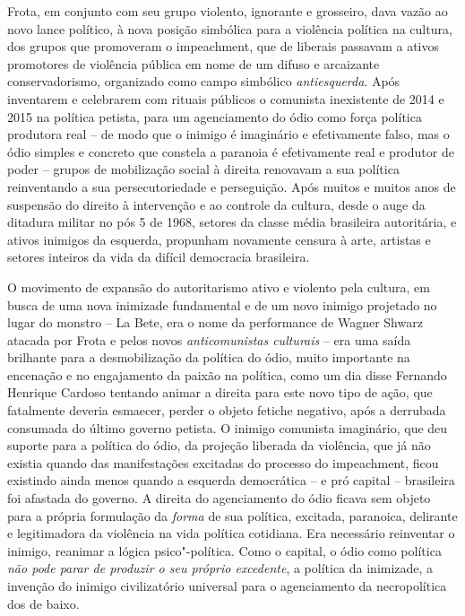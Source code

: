 Frota, em conjunto com seu grupo violento, ignorante e grosseiro, dava
vazão ao novo lance político, à nova posição simbólica para a violência
política na cultura, dos grupos que promoveram o impeachment, que de
liberais passavam a ativos promotores de violência pública em nome de um
difuso e arcaizante conservadorismo, organizado como campo simbólico
\emph{antiesquerda}. Após inventarem e celebrarem com rituais públicos o
comunista inexistente de 2014 e 2015 na política petista, para um
agenciamento do ódio como força política produtora real -- de modo que o
inimigo é imaginário e efetivamente falso, mas o ódio simples e concreto
que constela a paranoia é efetivamente real e produtor de poder --
grupos de mobilização social à direita renovavam a sua política
reinventando a sua persecutoriedade e perseguição. Após muitos e muitos
anos de suspensão do direito à intervenção e ao controle da cultura,
desde o auge da ditadura militar no pós  5 de 1968, setores da classe
média brasileira autoritária, e ativos inimigos da esquerda, propunham
novamente censura à arte, artistas e setores inteiros da vida da difícil
democracia brasileira.

O movimento de expansão do autoritarismo ativo e violento pela cultura,
em busca de uma nova inimizade fundamental e de um novo inimigo
projetado no lugar do monstro -- La Bete, era o nome da performance de
Wagner Shwarz atacada por Frota e pelos novos \emph{anticomunistas
culturais} -- era uma saída brilhante para a desmobilização da política
do ódio, muito importante na encenação e no engajamento da paixão na
política, como um dia disse Fernando Henrique Cardoso tentando animar a
direita para este novo tipo de ação, que fatalmente deveria esmaecer,
perder o objeto fetiche negativo, após a derrubada consumada do último
governo petista. O inimigo comunista imaginário, que deu suporte para a
política do ódio, da projeção liberada da violência, que já não existia
quando das manifestações excitadas do processo do impeachment, ficou
existindo ainda menos quando a esquerda democrática -- e pró capital --
brasileira foi afastada do governo. A direita do agenciamento do ódio
ficava sem objeto para a própria formulação da \emph{forma} de sua
política, excitada, paranoica, delirante e legitimadora da violência na
vida política cotidiana. Era necessário reinventar o inimigo, reanimar a
lógica psico"-política. Como o capital, o ódio como política \emph{não
pode parar de produzir o seu próprio excedente}, a política da
inimizade, a invenção do inimigo civilizatório universal para o
agenciamento da necropolítica dos de baixo.

